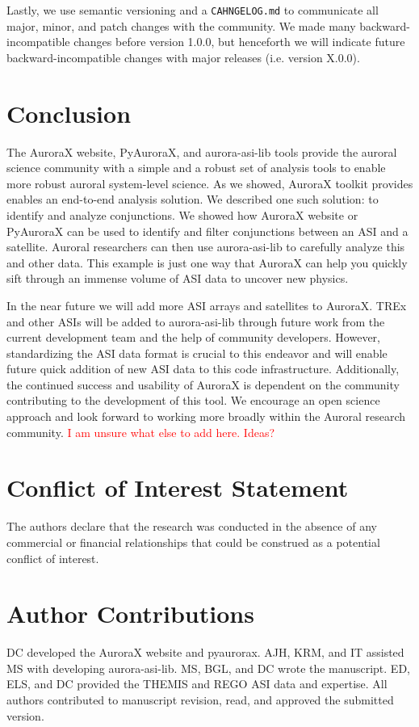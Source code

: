 \documentclass[utf8]{FrontiersinHarvard} %
\begin{document}
Lastly, we use semantic versioning and a \verb|CAHNGELOG.md| to communicate all major, minor, and patch changes with the community. We made many backward-incompatible changes before version 1.0.0, but henceforth we will indicate future backward-incompatible changes with major releases (i.e. version X.0.0). 

\section{Conclusion}
The AuroraX website, PyAuroraX, and aurora-asi-lib tools provide the auroral science community with a simple and a robust set of analysis tools to enable more robust auroral system-level science. As we showed, AuroraX toolkit provides enables an end-to-end analysis solution. We described one such solution: to identify and analyze conjunctions. We showed how AuroraX website or PyAuroraX can be used to identify and filter conjunctions between an ASI and a satellite. Auroral researchers can then use aurora-asi-lib to carefully analyze this and other data. This example is just one way that AuroraX can help you quickly sift through an immense volume of ASI data to uncover new physics.

In the near future we will add more ASI arrays and satellites to AuroraX. TREx and other ASIs will be added to aurora-asi-lib through future work from the current development team and the help of community developers. However, standardizing the ASI data format is crucial to this endeavor and will enable future quick addition of new ASI data to this code infrastructure. Additionally, the continued success and usability of AuroraX is dependent on the community contributing to the development of this tool. We encourage an open science approach and look forward to working more broadly within the Auroral research community.  \textcolor{red}{I am unsure what else to add here. Ideas?}

\section*{Conflict of Interest Statement}
The authors declare that the research was conducted in the absence of any commercial or financial relationships that could be construed as a potential conflict of interest.

\section*{Author Contributions}
DC developed the AuroraX website and pyaurorax. AJH, KRM, and IT assisted MS with developing aurora-asi-lib. MS, BGL, and DC wrote the manuscript. ED, ELS, and DC provided the THEMIS and REGO ASI data and expertise.  All authors contributed to manuscript revision, read, and approved the submitted version.
\end{document}

